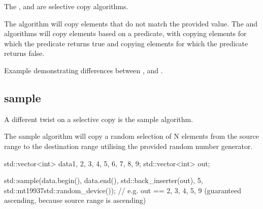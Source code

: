 The ,  and  are selective copy algorithms.



The  algorithm will copy elements that do not match the provided value. The  and  algorithms will copy elements based on a predicate, with  copying elements for which the predicate returns true and  copying elements for which the predicate returns false.

\begin{box-note}
\footnotesize Example demonstrating differences between ,  and .
\tcblower
{}
\end{box-note}

\subsection{sample}

A different twist on a selective copy is the sample algorithm.



The sample algorithm will copy a random selection of N elements from the source range to the destination range utilising the provided random number generator.

\begin{box-note}
\begin{cppcode}
std::vector<int> data{1, 2, 3, 4, 5, 6, 7, 8, 9};
std::vector<int> out;

std::sample(data.begin(), data.end(), std::back_inserter(out),
            5, std::mt19937{std::random_device{}()});
// e.g. out == {2, 3, 4, 5, 9} (guaranteed ascending, because source range is ascending)
\end{cppcode}
\end{box-note}

